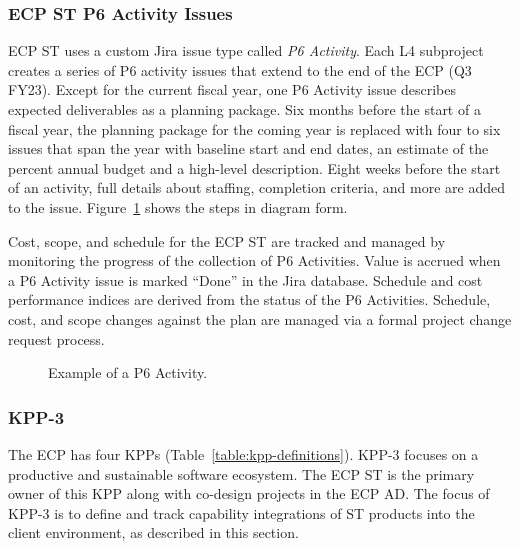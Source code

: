 \subsubsection{ECP ST P6 Activity Issues}

ECP ST uses a custom Jira issue type called \textit{P6 Activity}.  Each L4 subproject creates a series of P6 activity issues that extend to the end of the ECP (Q3 FY23).  Except for the current fiscal year, one P6 Activity issue describes expected deliverables as a planning package.  Six months before the start of a fiscal year, the planning package for the coming year is replaced with four to six issues that span the year with baseline start and end dates, an estimate of the percent annual budget and a high-level description.  Eight weeks before the start of an activity, full details about staffing, completion criteria, and more are added to the issue.  Figure~\ref{fig:planning-process} shows the steps in diagram form.  

Cost, scope, and schedule for the ECP ST are tracked and managed by monitoring the progress of the collection of P6 Activities.  Value is accrued when a P6 Activity issue is marked ``Done'' in the Jira database.  Schedule and cost performance indices are derived from the status of the P6 Activities.  Schedule, cost, and scope changes against the plan are managed via a formal project change request process.

\begin{figure}
	\centering
	\caption{Example of a P6 Activity.} 
	\label{fig:planning-process}
\end{figure}


\subsubsection{KPP-3}

The ECP has four KPPs (Table~\ref{table:kpp-definitions}). KPP-3 focuses on a productive and sustainable software ecosystem. The ECP ST is the primary owner of this KPP along with co-design projects in the ECP AD.  The focus of KPP-3 is to define and track capability integrations of ST products into the client environment, as described in this section. 


